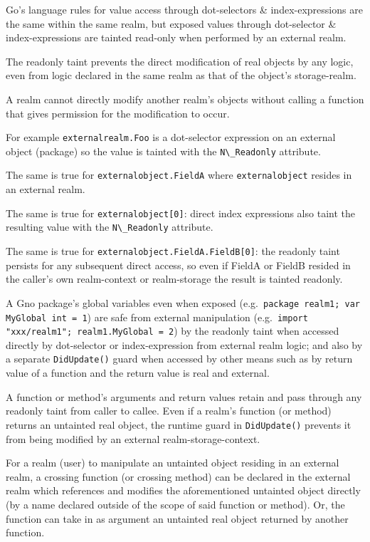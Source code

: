 \documentclass[12pt,a4paper]{article}
\newcommand{\passthrough}[1]{#1}
\begin{document}
Go's language rules for value access through dot-selectors \&
index-expressions are the same within the same realm, but exposed values
through dot-selector \& index-expressions are tainted read-only when
performed by an external realm.

The readonly taint prevents the direct modification of real objects by
any logic, even from logic declared in the same realm as that of the
object's storage-realm.

A realm cannot directly modify another realm's objects without calling a
function that gives permission for the modification to occur.

For example \passthrough{\lstinline!externalrealm.Foo!} is a
dot-selector expression on an external object (package) so the value is
tainted with the \passthrough{\lstinline!N\_Readonly!} attribute.

The same is true for \passthrough{\lstinline!externalobject.FieldA!}
where \passthrough{\lstinline!externalobject!} resides in an external
realm.

The same is true for \passthrough{\lstinline!externalobject[0]!}: direct
index expressions also taint the resulting value with the
\passthrough{\lstinline!N\_Readonly!} attribute.

The same is true for
\passthrough{\lstinline!externalobject.FieldA.FieldB[0]!}: the readonly
taint persists for any subsequent direct access, so even if FieldA or
FieldB resided in the caller's own realm-context or realm-storage the
result is tainted readonly.

A Gno package's global variables even when exposed
(e.g.~\passthrough{\lstinline!package realm1; var MyGlobal int = 1!})
are safe from external manipulation
(e.g.~\passthrough{\lstinline!import "xxx/realm1"; realm1.MyGlobal = 2!})
by the readonly taint when accessed directly by dot-selector or
index-expression from external realm logic; and also by a separate
\passthrough{\lstinline!DidUpdate()!} guard when accessed by other means
such as by return value of a function and the return value is real and
external.

A function or method's arguments and return values retain and pass
through any readonly taint from caller to callee. Even if a realm's
function (or method) returns an untainted real object, the runtime guard
in \passthrough{\lstinline!DidUpdate()!} prevents it from being modified
by an external realm-storage-context.

For a realm (user) to manipulate an untainted object residing in an
external realm, a crossing function (or crossing method) can be declared
in the external realm which references and modifies the aforementioned untainted object
directly (by a name declared outside of the scope of said function or
method). Or, the function can take in as argument an untainted real
object returned by another function.
\end{document}
